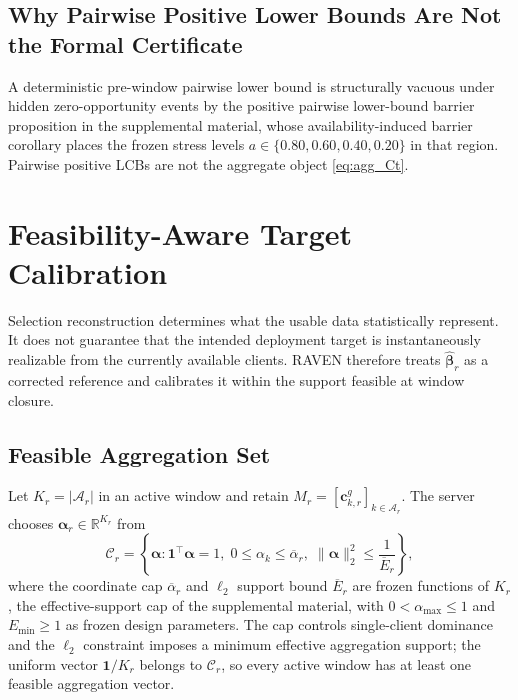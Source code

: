 \documentclass[letterpaper,journal]{IEEEtran}
\begin{document}
\subsection{Why Pairwise Positive Lower Bounds Are Not the Formal Certificate}
\label{subsec:pairwise_barrier}

A deterministic pre-window pairwise lower bound is structurally vacuous under
hidden zero-opportunity events by the positive pairwise lower-bound barrier
proposition in the supplemental material, whose availability-induced barrier
corollary places the frozen stress levels $a\in\{0.80,0.60,0.40,0.20\}$ in that
region.  Pairwise positive LCBs are not the aggregate object \eqref{eq:agg_Ct}.


\section{Feasibility-Aware Target Calibration}
\label{sec:calibration}

Selection reconstruction determines what the usable data statistically
represent.  It does not guarantee that the intended deployment target is
instantaneously realizable from the currently available clients.  RAVEN
therefore treats $\widehat{\boldsymbol\beta}_r$ as a corrected reference and
calibrates it within the support feasible at window closure.

\subsection{Feasible Aggregation Set}
\label{subsec:feasible_set}

Let $K_r=|\mathcal{A}_r|$ in an active window and retain
$M_r=[\mathbf{c}^{g}_{k,r}]_{k\in\mathcal{A}_r}$.  The server chooses
$\boldsymbol\alpha_r\in\mathbb{R}^{K_r}$ from
\begin{equation}
 \mathcal{C}_r
 =
 \left\{
 \boldsymbol\alpha:
 \mathbf{1}^{\top}\boldsymbol\alpha=1,\;
 0\le\alpha_k\le\overline\alpha_r,\;
 \|\boldsymbol\alpha\|_2^2\le\frac{1}{\overline E_r}
 \right\},
 \label{eq:Cr}
\end{equation}
where the coordinate cap $\overline\alpha_r$ and $\ell_2$ support bound
$\overline E_r$ are frozen functions of $K_r$, the effective-support cap of the
supplemental material, with $0<\alpha_{\max}\le1$ and $E_{\min}\ge1$ as frozen
design parameters.  The cap controls single-client dominance and the $\ell_2$
constraint imposes a minimum effective aggregation support; the uniform vector
$\mathbf{1}/K_r$ belongs to $\mathcal{C}_r$, so every active window has at least
one feasible aggregation vector.
\end{document}
